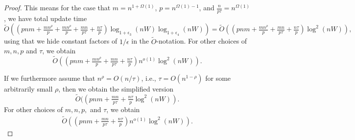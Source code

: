 \begin{proof}
This means for the case that $m=n^{1+\Omega(1)}$, $p=n^{\Omega(1)-1}$, and $\tfrac{n}{p\tau}=n^{\Omega(1)}$, we have total update time
$$ \tilde O ((pnm + \tfrac{mn^\rho}{p}+\tfrac{mn^{\rho}}{p}  + \tfrac{m n }{p\tau}+\tfrac{n\tau}{ p})\log_{1+\epsilon_3}(nW)\log_{1+\epsilon_4}(nW)) = \tilde O ((pnm + \tfrac{mn^{\rho}}{p} + \tfrac{m n }{p\tau}+\tfrac{n\tau}{ p})\log^2(nW)), $$
using that we hide constant factors of $1/\epsilon$ in the $\tilde O$-notation. 
For other choices of $m,n,p$ and $\tau$, we obtain 
$$ \tilde O ((pnm + \tfrac{mn^{\rho}}{p} + \tfrac{m n }{p\tau}+\tfrac{n\tau}{ p})n^{o(1)}\log^2(nW)). $$

If we furthermore assume that $n^\rho = O(n/\tau)$, i.e., $\tau = O(n^{1-\rho})$ for some arbitrarily small $\rho$, then we obtain the simplified version
$$ \tilde O ((pnm +   \tfrac{m n }{p\tau}+\tfrac{n\tau}{ p}\log^2(nW)).$$
For other choices of $m,n,p,$ and $\tau$, we obtain 
\begin{align*}
     \tilde O ((pnm + \tfrac{m n }{p\tau}+\tfrac{n\tau}{ p})n^{o(1)}\log^2(nW)). 
\end{align*}
\end{proof}


    






